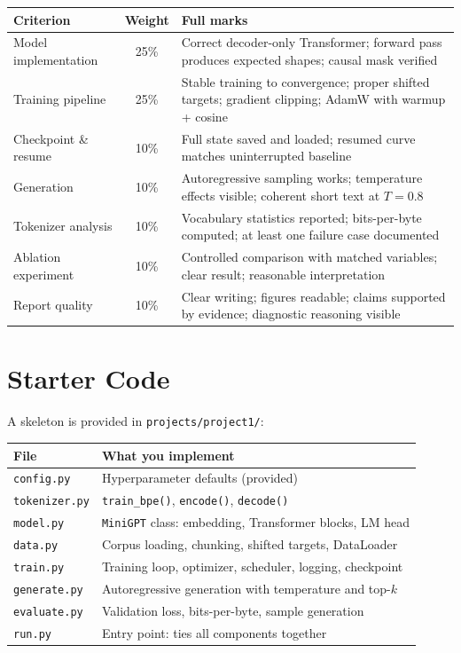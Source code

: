 \begin{center}
\begin{tabular}{lcp{8cm}}
\toprule
\textbf{Criterion} & \textbf{Weight} & \textbf{Full marks} \\
\midrule
Model implementation & 25\% & Correct decoder-only Transformer; forward pass produces expected shapes; causal mask verified \\
Training pipeline & 25\% & Stable training to convergence; proper shifted targets; gradient clipping; AdamW with warmup + cosine \\
Checkpoint \& resume & 10\% & Full state saved and loaded; resumed curve matches uninterrupted baseline \\
Generation & 10\% & Autoregressive sampling works; temperature effects visible; coherent short text at $T{=}0.8$ \\
Tokenizer analysis & 10\% & Vocabulary statistics reported; bits-per-byte computed; at least one failure case documented \\
Ablation experiment & 10\% & Controlled comparison with matched variables; clear result; reasonable interpretation \\
Report quality & 10\% & Clear writing; figures readable; claims supported by evidence; diagnostic reasoning visible \\
\bottomrule
\end{tabular}
\end{center}


\section*{Starter Code}

A skeleton is provided in \texttt{projects/project1/}:

\begin{center}
\begin{tabular}{ll}
\toprule
\textbf{File} & \textbf{What you implement} \\
\midrule
\texttt{config.py} & Hyperparameter defaults (provided) \\
\texttt{tokenizer.py} & \texttt{train\_bpe()}, \texttt{encode()}, \texttt{decode()} \\
\texttt{model.py} & \texttt{MiniGPT} class: embedding, Transformer blocks, LM head \\
\texttt{data.py} & Corpus loading, chunking, shifted targets, DataLoader \\
\texttt{train.py} & Training loop, optimizer, scheduler, logging, checkpoint \\
\texttt{generate.py} & Autoregressive generation with temperature and top-$k$ \\
\texttt{evaluate.py} & Validation loss, bits-per-byte, sample generation \\
\texttt{run.py} & Entry point: ties all components together \\
\bottomrule
\end{tabular}
\end{center}

